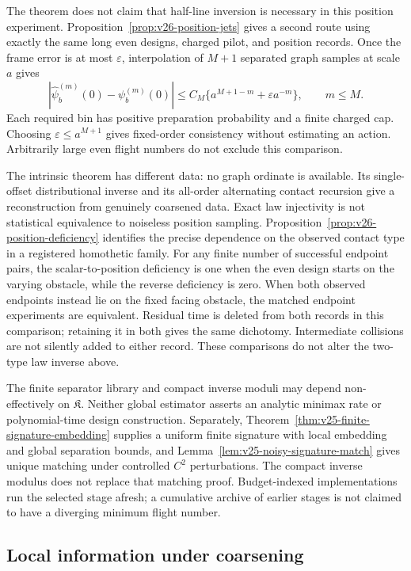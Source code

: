 The theorem does not claim that half-line inversion is necessary in this
position experiment.  Proposition~\ref{prop:v26-position-jets} gives a
second route using exactly the same long even designs, charged pilot, and
position records.  Once the frame error is at most \(\varepsilon\),
interpolation of \(M+1\) separated graph samples at scale \(a\) gives
\[
 |\widehat\psi_b^{(m)}(0)-\psi_b^{(m)}(0)|
 \le C_M\{a^{M+1-m}+\varepsilon a^{-m}\},\qquad m\le M.
\]
Each required bin has positive preparation probability and a finite charged
cap.  Choosing \(\varepsilon\le a^{M+1}\) gives fixed-order consistency
without estimating an action.  Arbitrarily large even flight numbers do
not exclude this comparison.

The intrinsic theorem has different data: no graph ordinate is available.
Its single-offset distributional inverse and its all-order alternating
contact recursion give a reconstruction from genuinely coarsened data.
Exact law injectivity is not statistical equivalence to noiseless position
sampling.  Proposition~\ref{prop:v26-position-deficiency} identifies
the precise dependence on the observed contact type in a registered
homothetic family.  For any finite number of successful endpoint pairs,
the scalar-to-position deficiency is one when the even design starts
on the varying obstacle, while the reverse deficiency is zero.  When
both observed endpoints instead lie on the fixed facing obstacle, the
matched endpoint experiments are equivalent.  Residual time is deleted
from both records in this comparison; retaining it in both gives the
same dichotomy.  Intermediate collisions are not silently added to either
record.  These comparisons do not alter the two-type law inverse above.

The finite separator library and compact inverse moduli may depend
non-effectively on \(\mathfrak K\).  Neither global estimator asserts an
analytic minimax rate or polynomial-time design construction.  Separately,
Theorem~\ref{thm:v25-finite-signature-embedding} supplies a uniform finite
signature with local embedding and global separation bounds, and
Lemma~\ref{lem:v25-noisy-signature-match} gives unique matching under
controlled \(C^2\) perturbations.  The compact inverse modulus does not
replace that matching proof.  Budget-indexed implementations run the selected
stage afresh; a cumulative archive of earlier stages is not claimed to
have a diverging minimum flight number.

\subsection{Local information under coarsening}

